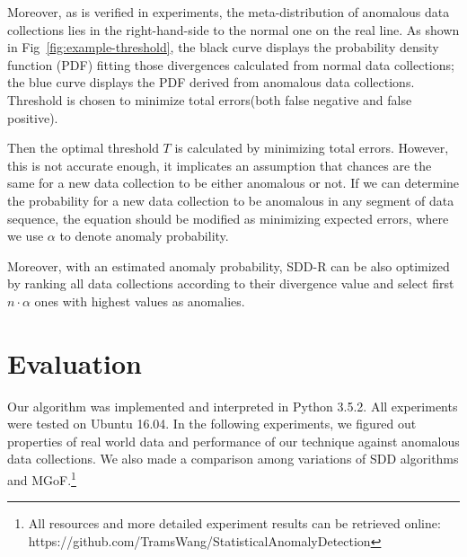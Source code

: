 \documentclass{article}
\begin{document}
			Moreover, as is verified in experiments, the meta-distribution of anomalous data collections lies in the right-hand-side to the normal one on the real line. As shown in Fig~\ref{fig:example-threshold}, the black curve displays the probability density function (PDF) fitting those divergences calculated from normal data collections; the blue curve displays the PDF derived from anomalous data collections. Threshold is chosen to minimize total errors(both false negative and false positive).
			
			Then the optimal threshold $T$ is calculated by minimizing total errors.
			However, this is not accurate enough, it implicates an assumption that chances are the same for a new data collection to be either anomalous or not. If we can determine the probability for a new data collection to be anomalous in any segment of data sequence, the equation should be modified as minimizing expected errors, where we use $\alpha$ to denote anomaly probability.
	
			Moreover, with an estimated anomaly probability, SDD-R can be also optimized by ranking all data collections according to their divergence value and select first $n \cdot \alpha$ ones with highest values as anomalies.
	
	\section{Evaluation}\label{sec:evaluation}
		Our algorithm was implemented and interpreted in Python 3.5.2. All experiments were tested on Ubuntu 16.04. In the following experiments, we figured out properties of real world data and performance of our technique against anomalous data collections. We also made a comparison among variations of SDD algorithms and MGoF.\footnote{All resources and more detailed experiment results can be retrieved online: https://github.com/TramsWang/StatisticalAnomalyDetection}
	
\end{document}
